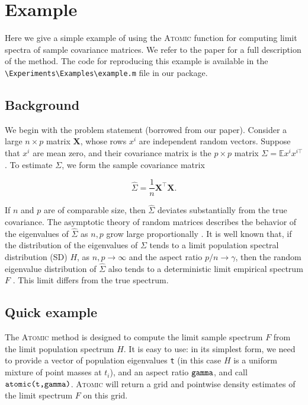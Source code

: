 \documentclass[english,11pt]{article} %
\begin{document}
\section{Example}
\label{example}

Here we give a simple example of using the \textsc{Atomic} function for computing limit spectra of sample covariance matrices. We refer to the paper \cite{dobriban2015precise} for a full description of the method. The code for reproducing this example is available in the \verb+\Experiments\Examples\example.m+ file in our package. 

\subsection{Background}

We begin with the problem statement (borrowed from our paper). Consider a large $n \times p$ matrix $\mathbf{X}$, whose rows $x^i$ are independent random vectors. Suppose that $x^i$ are mean zero, and their covariance matrix is the $p \times p$ matrix $\Sigma = \mathbb{E}{x^i x^{i\top}}$. To estimate $\Sigma$, we form the sample covariance matrix

$$
\widehat{\Sigma} = \frac{1}{n} \mathbf{X}^\top \mathbf{X}.
$$

If $n$ and $p$ are of comparable size, then $\widehat{\Sigma}$ deviates substantially from the true covariance. The asymptotic theory of random matrices describes the behavior of the eigenvalues of $\widehat{\Sigma}$ as $n,p$ grow large proportionally \citep[e.g.][]{bai2009spectral}. It is well known that, if the distribution of the eigenvalues of $\Sigma$ tends to a limit population spectral distribution (SD) $H$, as $n,p \to \infty$ and the aspect ratio $p/n \to \gamma$, then the random eigenvalue distribution of $\widehat{\Sigma}$ also tends to a deterministic limit empirical spectrum $F$ \citep{marchenko1967distribution,silverstein1995strong}. This limit differs from the true spectrum.

\subsection{Quick example}

The \textsc{Atomic} method is designed to compute the limit sample spectrum $F$ from the limit population spectrum $H$. It is easy to use: in its simplest form, we need to provide a vector of population eigenvalues \verb+t+ (in this case $H$ is a uniform mixture of point masses at $t_i$), and an aspect ratio $\verb+gamma+$, and call $\verb+atomic(t,gamma)+$. \textsc{Atomic} will return a grid and pointwise density estimates of the limit spectrum $F$ on this grid. 
\end{document}
